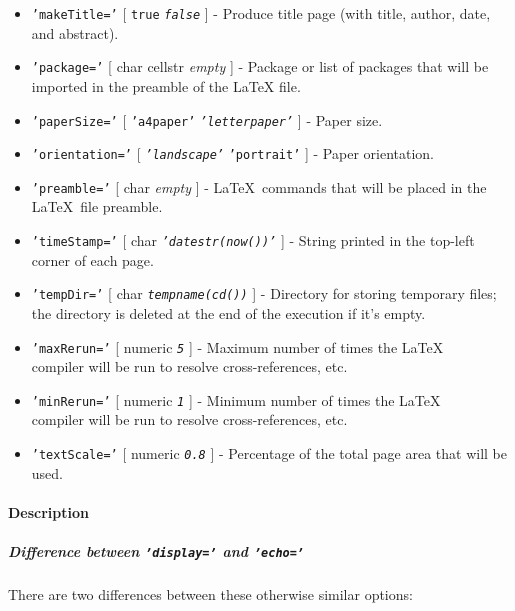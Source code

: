 \begin{itemize}
 \item
   \texttt{'makeTitle='} {[} \texttt{true} \textbar{}
   \emph{\texttt{false}} {]} - Produce title page (with title, author,
   date, and abstract).
 \item
   \texttt{'package='} {[} char \textbar{} cellstr \textbar{}
   \emph{empty} {]} - Package or list of packages that will be imported
   in the preamble of the LaTeX file.
 \item
   \texttt{'paperSize='} {[} \texttt{'a4paper'} \textbar{}
   \emph{\texttt{'letterpaper'}} {]} - Paper size.
 \item
   \texttt{'orientation='} {[} \emph{\texttt{'landscape'}} \textbar{}
   \texttt{'portrait'} {]} - Paper orientation.
 \item
   \texttt{'preamble='} {[} char \textbar{} \emph{empty} {]} -
   \LaTeX~commands that will be placed in the \LaTeX~file preamble.
 \item
   \texttt{'timeStamp='} {[} char \textbar{}
   \emph{\texttt{'datestr(now())'}} {]} - String printed in the top-left
   corner of each page.
 \item
   \texttt{'tempDir='} {[} char \textbar{} \emph{\texttt{tempname(cd())}}
   {]} - Directory for storing temporary files; the directory is deleted
   at the end of the execution if it's empty.
 \item
   \texttt{'maxRerun='} {[} numeric \textbar{} \emph{\texttt{5}} {]} -
   Maximum number of times the \LaTeX\\compiler will be run to resolve
   cross-references, etc.
 \item
   \texttt{'minRerun='} {[} numeric \textbar{} \emph{\texttt{1}} {]} -
   Minimum number of times the \LaTeX\\compiler will be run to resolve
   cross-references, etc.
 \item
   \texttt{'textScale='} {[} numeric \textbar{} \emph{\texttt{0.8}} {]} -
   Percentage of the total page area that will be used.
 \end{itemize}
 
 \paragraph{Description}
 
 \subparagraph{Difference between \texttt{'display='} and
 \texttt{'echo='}}
 
 There are two differences between these otherwise similar options:
 
